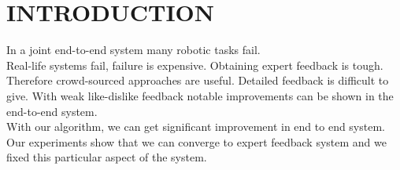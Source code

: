 \section{INTRODUCTION}

In a joint end-to-end system many robotic tasks fail.  \\

Real-life systems fail, failure is expensive. Obtaining expert feedback is
tough.
Therefore crowd-sourced approaches are useful. Detailed feedback is difficult to
give. With weak like-dislike feedback notable improvements can be shown in the
end-to-end system.  \\

With our algorithm, we can get significant improvement in end to end system. \\

Our experiments show that we can converge to expert feedback system and we fixed
this particular aspect of the system.
